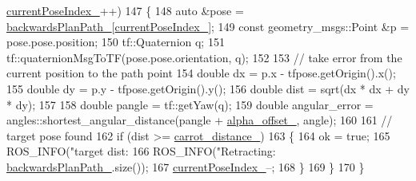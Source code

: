 \begin{DoxyCode}
{      \hyperlink{classmove__base__z__client_1_1backward__local__planner_1_1BackwardLocalPlanner_af304b2e7cde744ad905a1ae7889102b6}{currentPoseIndex\_}++)
147         \{
148             \textcolor{keyword}{auto} &pose = \hyperlink{classmove__base__z__client_1_1backward__local__planner_1_1BackwardLocalPlanner_a451add2af7d6d83a7415277311b3ed04}{backwardsPlanPath\_}[\hyperlink{classmove__base__z__client_1_1backward__local__planner_1_1BackwardLocalPlanner_af304b2e7cde744ad905a1ae7889102b6}{currentPoseIndex\_}];
149             \textcolor{keyword}{const} geometry\_msgs::Point &p = pose.pose.position;
150             tf::Quaternion q;
151             tf::quaternionMsgToTF(pose.pose.orientation, q);
152 
153             \textcolor{comment}{// take error from the current position to the path point}
154             \textcolor{keywordtype}{double} dx = p.x - tfpose.getOrigin().x();
155             \textcolor{keywordtype}{double} dy = p.y - tfpose.getOrigin().y();
156             \textcolor{keywordtype}{double} dist = sqrt(dx * dx + dy * dy);
157 
158             \textcolor{keywordtype}{double} pangle = tf::getYaw(q);
159             \textcolor{keywordtype}{double} angular\_error = angles::shortest\_angular\_distance(pangle + 
      \hyperlink{classmove__base__z__client_1_1backward__local__planner_1_1BackwardLocalPlanner_ad406c50cdc7a7603c023718543fc2f5c}{alpha\_offset\_}, angle);
160 
161             \textcolor{comment}{// target pose found}
162             \textcolor{keywordflow}{if} (dist >= \hyperlink{classmove__base__z__client_1_1backward__local__planner_1_1BackwardLocalPlanner_a6dc3aa0ff63f9f7d0aae852755734b5d}{carrot\_distance\_})
163             \{
164                 ok = \textcolor{keyword}{true};
165                 ROS\_INFO(\textcolor{stringliteral}{"target dist: %
166                 ROS\_INFO(\textcolor{stringliteral}{"Retracting: %
      \hyperlink{classmove__base__z__client_1_1backward__local__planner_1_1BackwardLocalPlanner_a451add2af7d6d83a7415277311b3ed04}{backwardsPlanPath\_}.size());
167                 \hyperlink{classmove__base__z__client_1_1backward__local__planner_1_1BackwardLocalPlanner_af304b2e7cde744ad905a1ae7889102b6}{currentPoseIndex\_}--;
168             \}
169         \}
170     \}
}}}
\end{DoxyCode}
